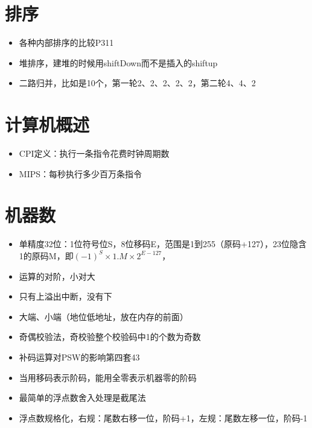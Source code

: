 \documentclass[UTF8]{ctexart}
\begin{document}
\section{排序}
\begin{itemize}
	\item 各种内部排序的比较P311
	\item 堆排序，建堆的时候用shiftDown而不是插入的shiftup
	\item 二路归并，比如是10个，第一轮2、2、2、2、2，第二轮4、4、2
\end{itemize}

\section{计算机概述}
\begin{itemize}
	\item CPI定义：执行一条指令花费时钟周期数
	\item MIPS：每秒执行多少百万条指令
\end{itemize}

\section{机器数}
\begin{itemize}
	\item 单精度32位：1位符号位S，8位移码E，范围是1到255（原码+127），23位隐含1的原码M，即$(-1)^S\times1.M\times2^{E-127}$，
	\item 运算的对阶，小对大
	\item 只有上溢出中断，没有下
	\item 大端、小端（地位低地址，放在内存的前面）
	\item 奇偶校验法，奇校验整个校验码中1的个数为奇数
	\item 补码运算对PSW的影响第四套43
	\item 当用移码表示阶码，能用全零表示机器零的阶码
	\item 最简单的浮点数舍入处理是截尾法
	\item 浮点数规格化，右规：尾数右移一位，阶码+1，左规：尾数左移一位，阶码-1
\end{itemize}
\end{document}
